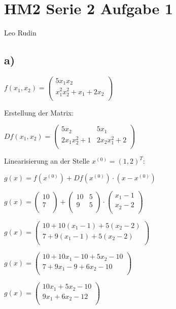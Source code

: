 \documentclass{article}
\begin{document}
\section*{HM2 Serie 2 Aufgabe 1}
Leo Rudin

\subsection*{a)}

\(f(x_1,x_2) = 
\begin{pmatrix}
5x_1x_2 \\
x_1^2x_2^2+x_1+2x_2 \\
\end{pmatrix}
\)

Erstellung der Matrix:

\(
Df(x_1,x_2) = 
\begin{pmatrix}
5x_2 & 5x_1 \\
2x_1x_2^2+1 & 2x_2x_1^2 + 2 \\
\end{pmatrix}
\)

Linearisierung an der Stelle \(x^{(0)} = (1,2)^T\):

\(g(x) = f(x^{(0)}) + Df(x^{(0)}) \cdot (x-x^{(0)})\)

\(
g(x) =
\begin{pmatrix}
10\\
7\\
\end{pmatrix}
+
\begin{pmatrix}
10 & 5\\
9 & 5\\
\end{pmatrix}
\cdot
\begin{pmatrix}
x_1 - 1\\
x_2 - 2\\
\end{pmatrix}
\)

\(
g(x) =
\begin{pmatrix}
10 + 10(x_1 - 1) + 5(x_2 - 2)\\
7 + 9(x_1 - 1) + 5(x_2 - 2)\\
\end{pmatrix}
\)

\(
g(x) =
\begin{pmatrix}
10 + 10x_1 - 10 + 5x_2 - 10\\
7 + 9x_1 - 9 + 6x_2 - 10\\
\end{pmatrix}
\)

\(
g(x) =
\begin{pmatrix}
10x_1 + 5x_2 - 10\\
9x_1 + 6x_2 - 12\\
\end{pmatrix}
\)
\end{document}

